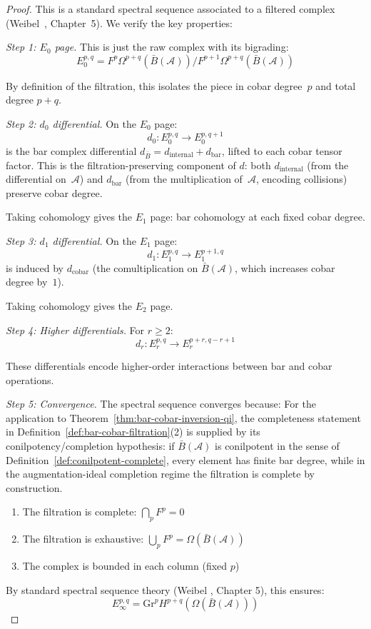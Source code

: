 \begin{proof}
This is a standard spectral sequence associated to a filtered complex (Weibel~\cite{Weibel94}, Chapter~5). We verify the key properties:

\emph{Step 1: $E_0$ page.} This is just the raw complex with its bigrading:
\[E_0^{p,q} = F^p\Omega^{p+q}(\bar{B}(\mathcal{A})) / F^{p+1}\Omega^{p+q}(\bar{B}(\mathcal{A}))\]

By definition of the filtration, this isolates the piece in cobar degree~$p$ and total degree $p+q$.

\emph{Step 2: $d_0$ differential.} On the $E_0$ page:
\[d_0: E_0^{p,q} \to E_0^{p,q+1}\]
is the bar complex differential $d_{\bar{B}} = d_{\text{internal}} + d_{\text{bar}}$, lifted to each cobar tensor factor. This is the filtration-preserving component of $d$: both $d_{\text{internal}}$ (from the differential on~$\mathcal{A}$) and $d_{\text{bar}}$ (from the multiplication of~$\mathcal{A}$, encoding collisions) preserve cobar degree.

Taking cohomology gives the $E_1$ page: bar cohomology at each fixed cobar degree.

\emph{Step 3: $d_1$ differential.} On the $E_1$ page:
\[d_1: E_1^{p,q} \to E_1^{p+1,q}\]
is induced by $d_{\text{cobar}}$ (the comultiplication on $\bar{B}(\mathcal{A})$, which increases cobar degree by~$1$).

Taking cohomology gives the $E_2$ page.

\emph{Step 4: Higher differentials.} For $r \geq 2$:
\[d_r: E_r^{p,q} \to E_r^{p+r,q-r+1}\]

These differentials encode higher-order interactions between bar and cobar operations.

\emph{Step 5: Convergence.} The spectral sequence converges because:
For the application to Theorem~\ref{thm:bar-cobar-inversion-qi}, the completeness statement in Definition~\ref{def:bar-cobar-filtration}(2) is supplied by its conilpotency/completion hypothesis: if $\bar{B}(\mathcal{A})$ is conilpotent in the sense of Definition~\ref{def:conilpotent-complete}, every element has finite bar degree, while in the augmentation-ideal completion regime the filtration is complete by construction.
\begin{enumerate}
\item The filtration is complete: $\bigcap_p F^p = 0$
\item The filtration is exhaustive: $\bigcup_p F^p = \Omega(\bar{B}(\mathcal{A}))$
\item The complex is bounded in each column (fixed $p$)
\end{enumerate}

By standard spectral sequence theory (Weibel \cite{Weibel94}, Chapter 5), this ensures:
\[E_\infty^{p,q} = \text{Gr}^p H^{p+q}(\Omega(\bar{B}(\mathcal{A})))\]
\end{proof}


